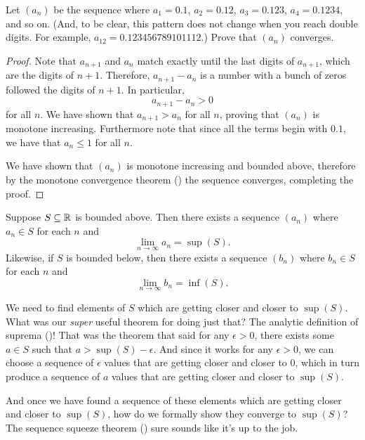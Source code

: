 \begin{example}
  Let $(a_n)$ be the sequence where $a_1 = 0.1$, $a_2 = 0.12$, $a_3 =
  0.123$, $a_4 = 0.1234$, and so on. (And, to be clear, this pattern
    does not change when you reach double digits. For example, $a_{12}
  = 0.123456789101112$.) Prove that $(a_n)$ converges.

  \begin{proof}
    Note that $a_{n+1}$ and $a_n$ match exactly until the last digits
    of $a_{n+1}$, which are the digits of $n + 1$. Therefore,
    $a_{n+1} - a_n$ is a number with a bunch of zeros followed the
    digits of $n + 1$. In particular,
    \[ a_{n+1} - a_n > 0 \]
    for all $n$. We have shown that $a_{n+1} > a_n$ for all $n$,
    proving that $(a_n)$ is monotone increasing. Furthermore note
    that since all the terms begin with $0.1$, we have that $a_n \leq
    1$ for all $n$.

    We have shown that $(a_n)$ is monotone increasing and bounded
    above, therefore by the monotone convergence theorem
    () the sequence converges,
    completing the proof.
  \end{proof}
\end{example}

\begin{proposition}
  Suppose $S \subseteq \mathbb R$ is bounded above. Then there exists a
  sequence $(a_n)$ where $a_n \in S$ for each $n$ and
  \[ \lim_{n \to \infty} a_n = \sup(S). \]
  Likewise, if $S$ is bounded below, then there exists a sequence
  $(b_n)$ where $b_n \in S$ for each $n$ and
  \[ \lim_{n \to \infty} b_n = \inf(S). \]
\end{proposition}

\begin{proofidea}
  We need to find elements of $S$ which are getting closer and closer
  to $\sup(S)$.
  What was our \textit{super} useful theorem for doing just that? The
  analytic definition of suprema ()!
  That was the theorem that said for any $\epsilon > 0$, there exists
  some $a \in S$ such that $a > \sup(S) - \epsilon$.
  And since it works for any $\epsilon > 0$, we can choose a sequence
  of $\epsilon$ values that are getting closer and closer to $0$,
  which in turn produce a sequence of $a$ values that are getting
  closer and closer to $\sup(S)$.

  And once we have found a sequence of these elements which are
  getting closer and closer to $\sup(S)$,
  how do we formally show they converge to $\sup(S)$? The sequence
  squeeze theorem ()
  sure sounds like it's up to the job.
\end{proofidea}


